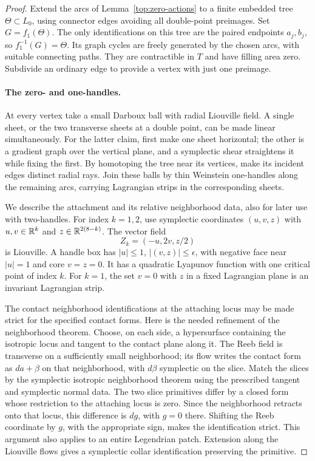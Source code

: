 \begin{proof}
Extend the arcs of Lemma~\ref{top:zero-actions} to a finite
embedded tree $\Theta\subset L_0$, using connector edges avoiding
all double-point preimages.  Set $G=f_1(\Theta)$.  The only
identifications on this tree are the paired endpoints $a_j,b_j$,
so $f_1^{-1}(G)=\Theta$.  Its graph cycles are freely generated
by the chosen arcs, with suitable connecting paths.  They are
contractible in $T$ and have filling area zero.  Subdivide an
ordinary edge to provide a vertex with just one preimage.

\paragraph{The zero- and one-handles.}
At every vertex take a small Darboux ball with radial Liouville
field.  A single sheet, or the two transverse sheets at a double
point, can be made linear simultaneously.  For the latter claim,
first make one sheet horizontal; the other is a gradient graph
over the vertical plane, and a symplectic shear straightens it
while fixing the first.  By homotoping the tree near its vertices,
make its incident edges distinct radial rays.  Join these balls by
thin Weinstein one-handles along the remaining arcs, carrying
Lagrangian strips in the corresponding sheets.

We describe the attachment and its relative neighborhood data,
also for later use with two-handles.  For index $k=1,2$, use
symplectic coordinates $(u,v,z)$ with $u,v\in\mathbb R^k$ and
$z\in\mathbb R^{2(8-k)}$.  The vector field
\begin{equation}\label{top:handle-field}
 Z_k=(-u,2v,z/2)
\end{equation}
is Liouville.  A handle box has $|u|\leq1$,
$|(v,z)|\leq\epsilon$, with negative face near $|u|=1$ and
core $v=z=0$.  It has a quadratic Lyapunov function with one
critical point of index $k$.  For $k=1$, the set $v=0$ with $z$
in a fixed Lagrangian plane is an invariant Lagrangian strip.

The contact neighborhood identifications at the attaching locus
may be made strict for the specified contact forms.  Here is the
needed refinement of the neighborhood theorem.  Choose, on each
side, a hypersurface containing the isotropic locus and tangent
to the contact plane along it.  The Reeb field is transverse on
a sufficiently small neighborhood; its flow writes the contact
form as $da+\beta$ on that neighborhood, with $d\beta$
symplectic on the slice.  Match the slices by the symplectic
isotropic neighborhood theorem using the prescribed tangent and
symplectic normal data.  The two slice primitives differ by a
closed form whose restriction to the attaching locus is zero.
Since the neighborhood retracts onto that locus, this difference
is $dg$, with $g=0$ there.  Shifting the Reeb coordinate by $g$,
with the appropriate sign, makes the identification strict.
This argument also applies to an entire Legendrian patch.
Extension along the Liouville flows gives a symplectic collar
identification preserving the primitive.


\end{proof}
